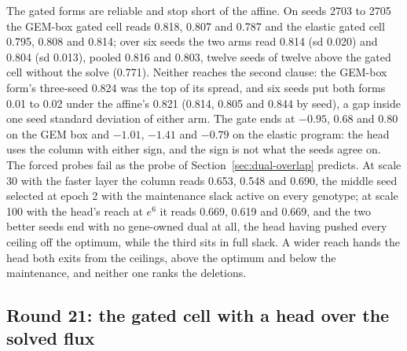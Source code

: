 


The gated forms are reliable and stop short of the affine. On seeds 2703 to 2705 the
GEM-box gated cell reads 0.818, 0.807 and 0.787 and the elastic gated cell 0.795,
0.808 and 0.814; over six seeds the two arms read 0.814 (sd 0.020) and 0.804 (sd 0.013),
pooled 0.816 and 0.803, twelve seeds of twelve above the gated cell without the solve
(0.771). Neither reaches the second clause: the GEM-box form's three-seed 0.824 was the
top of its spread, and six seeds put both forms 0.01 to 0.02 under the affine's 0.821
(0.814, 0.805 and 0.844 by seed), a gap inside one seed standard deviation of either
arm. The gate ends at $-0.95$, $0.68$ and $0.80$ on the GEM box and $-1.01$, $-1.41$
and $-0.79$ on the elastic program: the head uses the column with either sign, and the
sign is not what the seeds agree on. The forced probes fail as the probe of
Section~\ref{sec:dual-overlap} predicts. At scale 30 with the faster layer the column
reads 0.653, 0.548 and 0.690, the middle seed selected at epoch 2 with the maintenance
slack active on every genotype; at scale 100 with the head's reach at $e^{6}$ it reads
0.669, 0.619 and 0.669, and the two better seeds end with no gene-owned dual at all,
the head having pushed every ceiling off the optimum, while the third sits in full
slack. A wider reach hands the head both exits from the ceilings, above the optimum
and below the maintenance, and neither one ranks the deletions.

\subsection{Round 21: the gated cell with a head over the solved flux}
\label{sec:round21}

